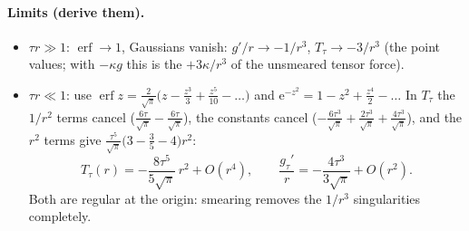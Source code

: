 \documentclass[11pt,a4paper]{article}
\numberwithin{equation}{section}
\theoremstyle{definition}
\theoremstyle{plain}
\theoremstyle{remark}
\numberwithin{algorithm}{section}
\newcommand{\ee}{\mathrm{e}}
\newcommand{\erf}{\operatorname{erf}}
\begin{document}
\paragraph{Limits (derive them).}
\begin{itemize}[leftmargin=1.3em,itemsep=2pt]
\item $\tau r\gg1$: $\erf\to1$, Gaussians vanish: $g'/r\to-1/r^3$, $T_\tau\to-3/r^3$ (the point values; with $-\kappa g$ this is the $+3\kappa/r^3$ of the unsmeared tensor force).
\item $\tau r\ll1$: use $\erf z=\frac2{\sqrt\pi}\big(z-\frac{z^3}3+\frac{z^5}{10}-\dots\big)$ and $\ee^{-z^2}=1-z^2+\frac{z^4}2-\dots$ In $T_\tau$ the $1/r^2$ terms cancel ($\frac{6\tau}{\sqrt\pi}-\frac{6\tau}{\sqrt\pi}$), the constants cancel ($-\frac{6\tau^3}{\sqrt\pi}+\frac{2\tau^3}{\sqrt\pi}+\frac{4\tau^3}{\sqrt\pi}$), and the $r^2$ terms give $\frac{\tau^5}{\sqrt\pi}\big(3-\frac35-4\big)r^2$:
\begin{equation}
T_\tau(r)=-\frac{8\tau^5}{5\sqrt\pi}\,r^2+O(r^4),\qquad \frac{g_\tau'}{r}=-\frac{4\tau^3}{3\sqrt\pi}+O(r^2).
\end{equation}
Both are regular at the origin: smearing removes the $1/r^3$ singularities completely.
\end{itemize}
\end{document}
